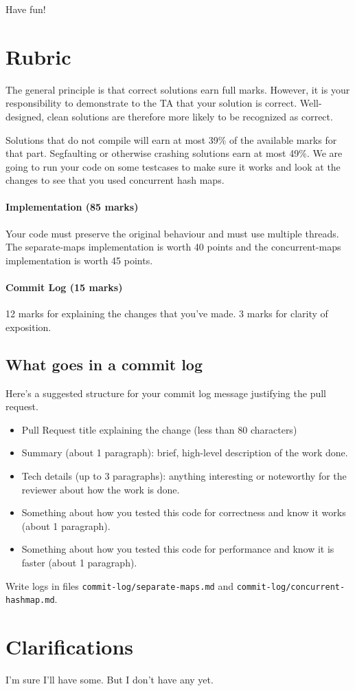 \documentclass[12pt]{article}
\renewcommand{\_}{\kern-1.5pt\textunderscore\kern-1.5pt}
\begin{document}
Have fun!

\section*{Rubric}
The general principle is that correct solutions earn full marks. However, it is your responsibility to demonstrate to the TA that your solution is correct. Well-designed, clean solutions are therefore more likely to be recognized as correct. \par

Solutions that do not compile will earn at most 39$\%$  of the available marks for that part. Segfaulting or otherwise crashing solutions earn at most 49$\%$. We are going to run your code on some testcases to make sure it works and look at the changes to see that you used concurrent hash maps.

\paragraph{Implementation (85 marks)} Your code must preserve the original behaviour and must use multiple threads. The separate-maps implementation is worth 40 points and the concurrent-maps implementation is worth 45 points.

\paragraph{Commit Log (15 marks)} 12 marks for explaining the changes that you've made. 3 marks for clarity of exposition. 

\subsection*{What goes in a commit log}
Here's a suggested structure for your commit log message justifying the pull request.
\begin{itemize}
\item Pull Request title explaining the change (less than 80 characters)
\item Summary (about 1 paragraph): brief, high-level description of the work done.
\item Tech details (up to 3 paragraphs): anything interesting or noteworthy for the reviewer about how the work is done. 
\item Something about how you tested this code for correctness and know it works (about 1 paragraph).
\item Something about how you tested this code for performance and know it is faster (about 1 paragraph).
\end{itemize}
Write logs in files {\tt commit-log/separate-maps.md} and {\tt commit-log/concurrent-hashmap.md}.

\section*{Clarifications}
I'm sure I'll have some. But I don't have any yet.



\end{document}
